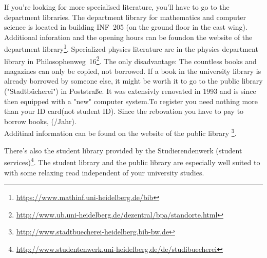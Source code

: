 If you're looking for more specialised literature, you'll have to go to the department libraries. The department library for mathematics and computer science is located in building \-\gls{INF}~205 (on the ground floor in the east wing). Additional inforation and the opening hours can be foundon the website of the department library\footnote{\url{https://www.mathinf.uni-heidelberg.de/bib}}. Specialized physics literature are in the physics department library in Philosophenweg~16\footnote{\url{http://www.ub.uni-heidelberg.de/dezentral/bpa/standorte.html}}. The only disadvantage: The countless books and magazines can only be copied, not borrowed. If a book in the university library is already borrowed by someone else, it might be worth it to go to the public library ("Stadtbücherei") in Poststraße. It was extensivly renovated in 1993 and is since then equipped with a "new" computer system.To register you need nothing more than your ID card(not student ID). Since the rebovation you have to pay to borrow books, (/Jahr).\\
Additinal information can be found on the website of the public library \footnote{\url{http://www.stadtbuecherei-heidelberg.bib-bw.de}}.

There's also the student library provided by the Studierendenwerk (student services)\footnote{\url{http://www.studentenwerk.uni-heidelberg.de/de/studibuecherei}}. The student library and the public library are especially well suited to with some relaxing read independent of your university studies.

